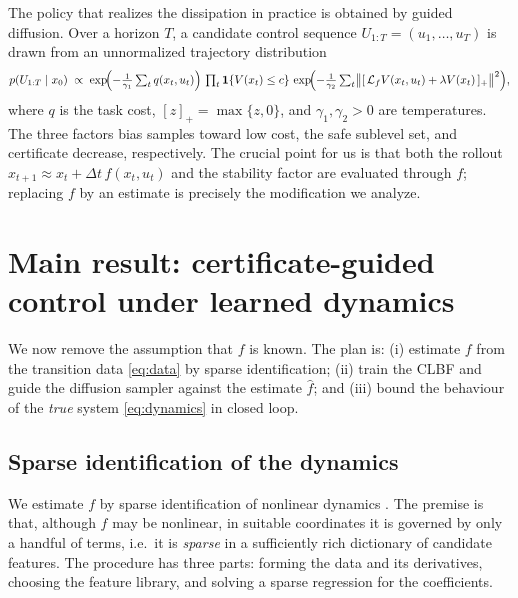 \documentclass{article}
\newcommand{\ind}{\mathbf{1}}         %
\newcommand{\Lie}[2]{\mathcal{L}_{#1} #2}
\newcommand{\hf}{\hat{f}}
\begin{document}
The policy that realizes the dissipation in practice is obtained by guided
diffusion. Over a horizon $T$, a candidate control sequence $U_{1:T}=(u_1,\dots,u_T)$
is drawn from an unnormalized trajectory distribution
\[
    p(U_{1:T}\mid x_0)\;\propto\;
    \exp\!\Bigl(-\tfrac{1}{\gamma_1}\textstyle\sum_t q(x_t,u_t)\Bigr)\,
    \prod_t \ind\{V(x_t)\le c\}\,
    \exp\!\Bigl(-\tfrac{1}{\gamma_2}\textstyle\sum_t \bigl\|[\,\Lie{f}{V}(x_t,u_t)+\lambda V(x_t)\,]_+\bigr\|^2\Bigr),
\]
where $q$ is the task cost, $[z]_+=\max\{z,0\}$, and $\gamma_1,\gamma_2>0$ are
temperatures. The three factors bias samples toward low cost, the safe sublevel
set, and certificate decrease, respectively. The crucial point for us is that both
the rollout $x_{t+1}\approx x_t+\Delta t\,f(x_t,u_t)$ and the stability factor are
evaluated through $f$; replacing $f$ by an estimate is precisely the modification
we analyze.

\section{Main result: certificate-guided control under learned dynamics}

We now remove the assumption that $f$ is known. The plan is: (i) estimate $f$ from
the transition data \eqref{eq:data} by sparse identification; (ii) train the CLBF
and guide the diffusion sampler against the estimate $\hf$; and (iii) bound the
behaviour of the \emph{true} system \eqref{eq:dynamics} in closed loop.

\subsection{Sparse identification of the dynamics}

We estimate $f$ by sparse identification of nonlinear dynamics
\citep{brunton2016discovering}. The premise is that, although $f$ may be
nonlinear, in suitable coordinates it is governed by only a handful of terms,
i.e.\ it is \emph{sparse} in a sufficiently rich dictionary of candidate
features. The procedure has three parts: forming the data and its derivatives,
choosing the feature library, and solving a sparse regression for the coefficients.
\end{document}
